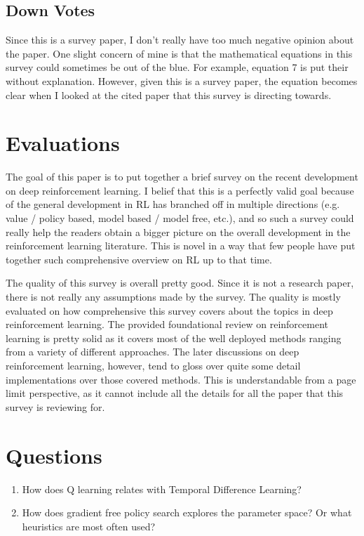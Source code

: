\documentclass[10pt, twocolumn]{article}
\begin{document}
\subsection{Down Votes}
Since this is a survey paper, I don't really have too much negative opinion
about the paper. One slight concern of mine is that the mathematical equations
in this survey could sometimes be out of the blue. For example, equation 7
is put their without explanation. However, given this is a survey paper, the
equation becomes clear when I looked at the cited paper that this survey
is directing towards.

\section{Evaluations}
The goal of this paper is to put together a brief survey on the recent
development on deep reinforcement learning. I belief that this is a perfectly
valid goal because of the general development in RL has branched off in multiple
directions (e.g. value / policy based, model based / model free, etc.), and so
such a survey could really help the readers obtain a bigger picture on the
overall development in the reinforcement learning literature. This is novel
in a way that few people have put together such comprehensive overview on RL
up to that time.

The quality of this survey is overall pretty good. Since it is not a research
paper, there is not really any assumptions made by the survey. The quality is
mostly evaluated on how comprehensive this survey covers about the topics in
deep reinforcement learning. The provided foundational review on reinforcement
learning is pretty solid as it covers most of the well deployed methods ranging
from a variety of different approaches. The later discussions on deep reinforcement
learning, however, tend to gloss over quite some detail implementations over
those covered methods. This is understandable from a page limit perspective, as
it cannot include all the details for all the paper that this survey is reviewing for.

\section{Questions}
\begin{enumerate}
  \item How does Q learning relates with Temporal Difference Learning?
  \item How does gradient free policy search explores the parameter space? Or
    what heuristics are most often used?
\end{enumerate}
\end{document}
